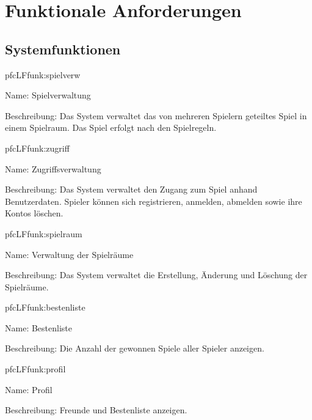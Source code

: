 \chapter{Funktionale Anforderungen}


\section{Systemfunktionen}

\setcounter{pfc}{10}

\begin{description}[leftmargin=5em, style=sameline]
	
	\begin{lhp}{pfc}{LF}{funk:spielverw}
		\item [Name:] Spielverwaltung
		\item [Beschreibung:] Das System verwaltet das von mehreren Spielern geteiltes Spiel in einem Spielraum. Das Spiel erfolgt nach den Spielregeln.
	\end{lhp}
	
	\begin{lhp}{pfc}{LF}{funk:zugriff}
		\item [Name:] Zugriffsverwaltung
		\item [Beschreibung:] Das System verwaltet den Zugang zum Spiel anhand Benutzerdaten. Spieler können sich registrieren, anmelden, abmelden sowie ihre Kontos löschen.
	\end{lhp}

	\begin{lhp}{pfc}{LF}{funk:spielraum}
		\item [Name:] Verwaltung der Spielräume
		\item [Beschreibung:] Das System verwaltet die Erstellung, Änderung und Löschung der Spielräume.
	\end{lhp}
	
	\begin{lhp}{pfc}{LF}{funk:bestenliste}
		\item [Name:] Bestenliste
		\item [Beschreibung:] Die Anzahl der gewonnen Spiele aller Spieler anzeigen.
	\end{lhp}
	
	\begin{lhp}{pfc}{LF}{funk:profil}
		\item [Name:] Profil
		\item [Beschreibung:] Freunde und Bestenliste anzeigen.
	\end{lhp}


\end{description}

